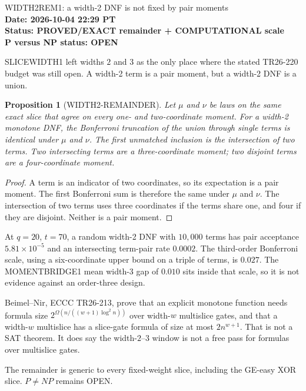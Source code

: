 \documentclass[11pt]{article}
\newtheorem{proposition}{Proposition}
\begin{document}
\begin{center}
{\Large WIDTH2REM1: a width-2 DNF is not fixed by pair moments}\\[4pt]
\textbf{Date: 2026-10-04 22:29 PT}\\
\textbf{Status: PROVED/EXACT remainder + COMPUTATIONAL scale}\\
\textbf{P versus NP status: OPEN}
\end{center}

SLICEWIDTH1 left widths $2$ and $3$ as the only place where the stated TR26-220 budget was still open. A width-2 term is a pair moment, but a width-2 DNF is a union.

\begin{proposition}[WIDTH2-REMAINDER]
Let $\mu$ and $\nu$ be laws on the same exact slice that agree on every one- and two-coordinate moment. For a width-2 monotone DNF, the Bonferroni truncation of the union through single terms is identical under $\mu$ and $\nu$. The first unmatched inclusion is the intersection of two terms. Two intersecting terms are a three-coordinate moment; two disjoint terms are a four-coordinate moment.
\end{proposition}
\begin{proof}
A term is an indicator of two coordinates, so its expectation is a pair moment. The first Bonferroni sum is therefore the same under $\mu$ and $\nu$. The intersection of two terms uses three coordinates if the terms share one, and four if they are disjoint. Neither is a pair moment.
\end{proof}

At $q=20$, $t=70$, a random width-2 DNF with $10{,}000$ terms has pair acceptance $5.81\times 10^{-5}$ and an intersecting term-pair rate $0.0002$. The third-order Bonferroni scale, using a six-coordinate upper bound on a triple of terms, is $0.027$. The MOMENTBRIDGE1 mean width-3 gap of $0.010$ sits inside that scale, so it is not evidence against an order-three design.

Beimel--Nir, ECCC TR26-213, prove that an explicit monotone function needs formula size $2^{\Omega(n/((w+1)\log^2 n))}$ over width-$w$ multislice gates, and that a width-$w$ multislice has a slice-gate formula of size at most $2n^{w+1}$. That is not a SAT theorem. It does say the width-$2$--$3$ window is not a free pass for formulas over multislice gates.

The remainder is generic to every fixed-weight slice, including the GE-easy XOR slice. $P\ne NP$ remains OPEN.
\end{document}
